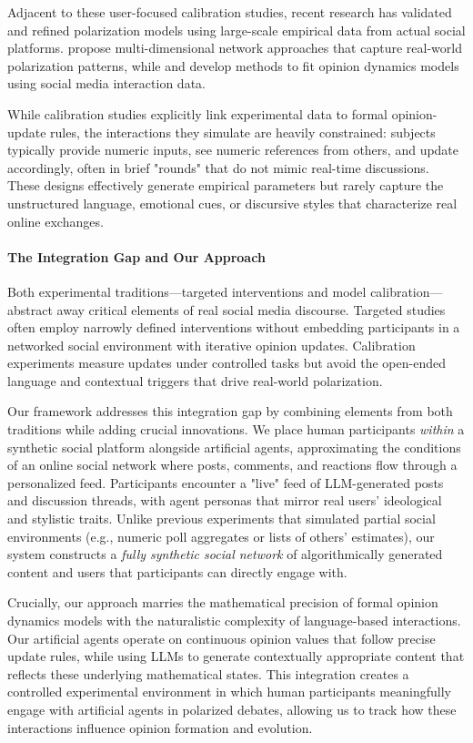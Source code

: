 Adjacent to these user-focused calibration studies, recent research has validated and refined polarization models using large-scale empirical data from actual social platforms. \citep{phillips_high-dimensional_2023} propose multi-dimensional network approaches that capture real-world polarization patterns, while \citep{valensise_drivers_2023} and \citep{peralta_multidimensional_2024} develop methods to fit opinion dynamics models using social media interaction data.

While calibration studies explicitly link experimental data to formal opinion-update rules, the interactions they simulate are heavily constrained: subjects typically provide numeric inputs, see numeric references from others, and update accordingly, often in brief "rounds" that do not mimic real-time discussions. These designs effectively generate empirical parameters but rarely capture the unstructured language, emotional cues, or discursive styles that characterize real online exchanges.

\paragraph{The Integration Gap and Our Approach}
Both experimental traditions—targeted interventions and model calibration—abstract away critical elements of real social media discourse. Targeted studies often employ narrowly defined interventions without embedding participants in a networked social environment with iterative opinion updates. Calibration experiments measure updates under controlled tasks but avoid the open-ended language and contextual triggers that drive real-world polarization.

Our framework addresses this integration gap by combining elements from both traditions while adding crucial innovations. We place human participants \emph{within} a synthetic social platform alongside artificial agents, approximating the conditions of an online social network where posts, comments, and reactions flow through a personalized feed. Participants encounter a "live" feed of LLM-generated posts and discussion threads, with agent personas that mirror real users' ideological and stylistic traits. Unlike previous experiments that simulated partial social environments (e.g., numeric poll aggregates or lists of others' estimates), our system constructs a \emph{fully synthetic social network} of algorithmically generated content and users that participants can directly engage with.

Crucially, our approach marries the mathematical precision of formal opinion dynamics models with the naturalistic complexity of language-based interactions. Our artificial agents operate on continuous opinion values that follow precise update rules, while using LLMs to generate contextually appropriate content that reflects these underlying mathematical states. This integration creates a controlled experimental environment in which human participants meaningfully engage with artificial agents in polarized debates, allowing us to track how these interactions influence opinion formation and evolution.

